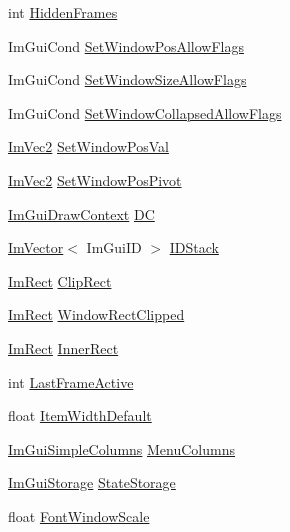 \begin{DoxyCompactItemize}
\item 
int \hyperlink{struct_im_gui_window_a91f60ca5e2e9ff4c34957e7cc239193e}{Hidden\+Frames}
\item 
Im\+Gui\+Cond \hyperlink{struct_im_gui_window_a8ff69a8bdc9221c9cc7d8ba656013d84}{Set\+Window\+Pos\+Allow\+Flags}
\item 
Im\+Gui\+Cond \hyperlink{struct_im_gui_window_a0c9419d95253214cb2a71d6ead1e03d6}{Set\+Window\+Size\+Allow\+Flags}
\item 
Im\+Gui\+Cond \hyperlink{struct_im_gui_window_a48384a3767252325e5c71b534adc58a9}{Set\+Window\+Collapsed\+Allow\+Flags}
\item 
\hyperlink{struct_im_vec2}{Im\+Vec2} \hyperlink{struct_im_gui_window_a6caed47ef8e25a2e7a68a6be72c5716a}{Set\+Window\+Pos\+Val}
\item 
\hyperlink{struct_im_vec2}{Im\+Vec2} \hyperlink{struct_im_gui_window_a4de5608bf44728447327d832fa84f0c9}{Set\+Window\+Pos\+Pivot}
\item 
\hyperlink{struct_im_gui_draw_context}{Im\+Gui\+Draw\+Context} \hyperlink{struct_im_gui_window_a3a20c68996093058481ae8e174258a04}{DC}
\item 
\hyperlink{class_im_vector}{Im\+Vector}$<$ Im\+Gui\+ID $>$ \hyperlink{struct_im_gui_window_a1a71724c43e37830ed9b38bd34f26917}{I\+D\+Stack}
\item 
\hyperlink{struct_im_rect}{Im\+Rect} \hyperlink{struct_im_gui_window_a9950a40b18de2579c4d3deb0ab33f455}{Clip\+Rect}
\item 
\hyperlink{struct_im_rect}{Im\+Rect} \hyperlink{struct_im_gui_window_ae0af9ff6c93baad6848143dd9d742ddd}{Window\+Rect\+Clipped}
\item 
\hyperlink{struct_im_rect}{Im\+Rect} \hyperlink{struct_im_gui_window_a0fd27908ebffb5d9509dc9e7f199d67d}{Inner\+Rect}
\item 
int \hyperlink{struct_im_gui_window_a6f3c194efabb4fd0a99be45fa5fe26f1}{Last\+Frame\+Active}
\item 
float \hyperlink{struct_im_gui_window_a5e6be361ee0c71a22a1ff68f6dbf09ff}{Item\+Width\+Default}
\item 
\hyperlink{struct_im_gui_simple_columns}{Im\+Gui\+Simple\+Columns} \hyperlink{struct_im_gui_window_a9207bb87da58863ce60c08679ef19977}{Menu\+Columns}
\item 
\hyperlink{struct_im_gui_storage}{Im\+Gui\+Storage} \hyperlink{struct_im_gui_window_a2151ab67f2624bd606883ad346179486}{State\+Storage}
\item 
float \hyperlink{struct_im_gui_window_a566ce9268a466afbbec78532d5cfa3c9}{Font\+Window\+Scale}

\end{DoxyCompactItemize}
